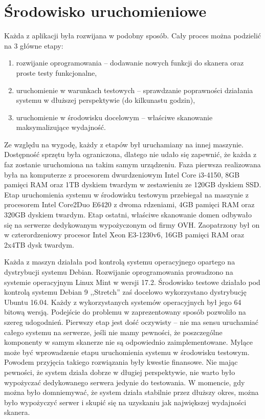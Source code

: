 \section{Środowisko uruchomieniowe}
\noindent Każda z aplikacji była rozwijana w podobny sposób. Cały proces można podzielić na 3 główne etapy:
\begin{enumerate}
	\item rozwijanie oprogramowania -- dodawanie nowych funkcji do skanera oraz proste testy funkcjonalne,
	\item uruchomienie w warunkach testowych -- sprawdzanie poprawności działania systemu w dłuższej perspektywie (do kilkunastu godzin),
	\item uruchomienie w środowisku docelowym -- właściwe skanowanie maksymalizujące wydajność.
\end{enumerate}
Ze względu na wygodę, każdy z etapów był uruchamiany na innej maszynie. Dostępność sprzętu była ograniczona, dlatego nie udało się
zapewnić, że każda z faz zostanie uruchomiona na takim samym urządzeniu. Faza pierwsza realizowana była na komputerze z procesorem
dwurdzeniowym Intel Core i3-4150, 8GB pamięci RAM oraz 1TB dyskiem twardym w zestawieniu ze 120GB dyskiem SSD. Etap uruchomienia systemu w
środowisku testowym przebiegał na maszynie z procesorem Intel Core2Duo E6420 z dwoma rdzeniami, 4GB pamięci RAM oraz 320GB dyskiem twardym. Etap ostatni,
właściwe skanowanie domen odbywało się na serwerze dedykowanym wypożyczonym od firmy OVH. Zaopatrzony był on w czterordzeniowy
procesor Intel Xeon E3-1230v6, 16GB pamięci RAM oraz 2x4TB dysk twardym.

Każda z maszyn działała pod kontrolą systemu operacyjnego opartego na dystrybucji systemu Debian. Rozwijanie oprogramowania prowadzono
na systemie operacyjnym Linux Mint w wersji 17.2. Środowisko testowe działało pod kontrolą systemu Debian 9 ,,Stretch'' zaś docelowo
wykorzystano dystrybucję Ubuntu 16.04. Każdy z wykorzystanych systemów operacyjnych był jego 64 bitową wersją. Podejście do problemu
w zaprezentowany sposób pozwoliło na szereg udogodnień. Pierwszy etap jest dość oczywisty -- nie ma sensu uruchamiać całego systemu
na serwerze, jeśli nie mamy pewności, że poszczególne komponenty w samym skanerze nie są odpowiednio zaimplementowane. Mylące może
być wprowadzenie etapu uruchomienia systemu w środowisku testowym. Powodem przyjęcia takiego rozwiązania były kwestie finansowe.
Nie mając pewności, że system działa dobrze w długiej perspektywie, nie warto było wypożyczać dedykowanego serwera jedynie do testowania.
W momencie, gdy można było domniemywać, że system działa stabilnie przez dłuższy okres, można było wypożyczyć serwer i skupić się
na uzyskaniu jak największej wydajności skanera.

